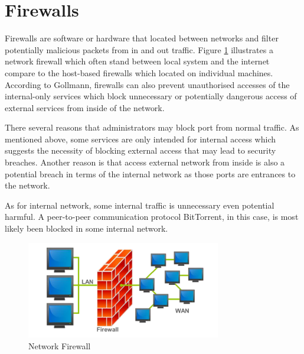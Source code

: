 \documentclass{article}
\begin{document}
\section{Firewalls}
\label{sec:firewalls}



Firewalls are software or hardware that located between networks and filter potentially malicious 
packets from in and out traffic\cite{AndersonRoss1956-2008Se:a}.
Figure \ref{firewall} illustrates a network firewall which often stand between local system and 
the internet compare to the host-based firewalls which located on individual machines. 
According to Gollmann, firewalls can also prevent unauthorised accesses of the internal-only services which 
block unnecessary or potentially dangerous access of external services from inside of the network\cite{GollmannDieter2011Cs/D}.


There several reasons that administrators may block port from normal traffic. As mentioned above, some services 
are only intended for internal access which suggests the necessity of blocking external access that 
may lead to security breaches. Another reason is that access external network from inside is also a potential 
breach in terms of the internal network as those ports are entrances to the network. 

As for internal network, some internal traffic is unnecessary even potential harmful. A peer-to-peer 
communication protocol BitTorrent, in this case, is most likely been blocked in some internal network.





\begin{figure}[htb]
  \includegraphics[width=8.5cm]{firewall}
  \caption{Network Firewall}
  \label{firewall}
\end{figure}
\end{document}
